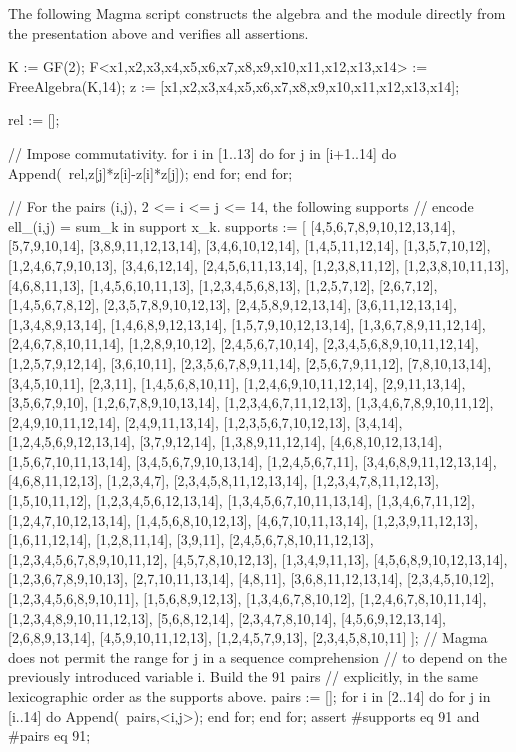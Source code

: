 \documentclass[a4paper]{amsart}
\theoremstyle{definition}
\theoremstyle{remark}
\numberwithin{equation}{section}
\begin{document}
The following Magma script constructs the algebra and the module directly from the presentation above and verifies all assertions.
\begin{MagmaCode}
K := GF(2);
F<x1,x2,x3,x4,x5,x6,x7,x8,x9,x10,x11,x12,x13,x14>
    := FreeAlgebra(K,14);
z := [x1,x2,x3,x4,x5,x6,x7,x8,x9,x10,x11,x12,x13,x14];

rel := [];

// Impose commutativity.
for i in [1..13] do
    for j in [i+1..14] do
        Append(~rel,z[j]*z[i]-z[i]*z[j]);
    end for;
end for;

// For the pairs (i,j), 2 <= i <= j <= 14, the following supports
// encode ell_(i,j) = sum_{k in support} x_k.
supports := [
    [4,5,6,7,8,9,10,12,13,14], [5,7,9,10,14], [3,8,9,11,12,13,14], [3,4,6,10,12,14],
    [1,4,5,11,12,14], [1,3,5,7,10,12], [1,2,4,6,7,9,10,13], [3,4,6,12,14],
    [2,4,5,6,11,13,14], [1,2,3,8,11,12], [1,2,3,8,10,11,13], [4,6,8,11,13],
    [1,4,5,6,10,11,13], [1,2,3,4,5,6,8,13], [1,2,5,7,12], [2,6,7,12],
    [1,4,5,6,7,8,12], [2,3,5,7,8,9,10,12,13], [2,4,5,8,9,12,13,14], [3,6,11,12,13,14],
    [1,3,4,8,9,13,14], [1,4,6,8,9,12,13,14], [1,5,7,9,10,12,13,14], [1,3,6,7,8,9,11,12,14],
    [2,4,6,7,8,10,11,14], [1,2,8,9,10,12], [2,4,5,6,7,10,14], [2,3,4,5,6,8,9,10,11,12,14],
    [1,2,5,7,9,12,14], [3,6,10,11], [2,3,5,6,7,8,9,11,14], [2,5,6,7,9,11,12],
    [7,8,10,13,14], [3,4,5,10,11], [2,3,11], [1,4,5,6,8,10,11],
    [1,2,4,6,9,10,11,12,14], [2,9,11,13,14], [3,5,6,7,9,10], [1,2,6,7,8,9,10,13,14],
    [1,2,3,4,6,7,11,12,13], [1,3,4,6,7,8,9,10,11,12], [2,4,9,10,11,12,14], [2,4,9,11,13,14],
    [1,2,3,5,6,7,10,12,13], [3,4,14], [1,2,4,5,6,9,12,13,14], [3,7,9,12,14],
    [1,3,8,9,11,12,14], [4,6,8,10,12,13,14], [1,5,6,7,10,11,13,14], [3,4,5,6,7,9,10,13,14],
    [1,2,4,5,6,7,11], [3,4,6,8,9,11,12,13,14], [4,6,8,11,12,13], [1,2,3,4,7],
    [2,3,4,5,8,11,12,13,14], [1,2,3,4,7,8,11,12,13], [1,5,10,11,12], [1,2,3,4,5,6,12,13,14],
    [1,3,4,5,6,7,10,11,13,14], [1,3,4,6,7,11,12], [1,2,4,7,10,12,13,14], [1,4,5,6,8,10,12,13],
    [4,6,7,10,11,13,14], [1,2,3,9,11,12,13], [1,6,11,12,14], [1,2,8,11,14],
    [3,9,11], [2,4,5,6,7,8,10,11,12,13], [1,2,3,4,5,6,7,8,9,10,11,12], [4,5,7,8,10,12,13],
    [1,3,4,9,11,13], [4,5,6,8,9,10,12,13,14], [1,2,3,6,7,8,9,10,13], [2,7,10,11,13,14],
    [4,8,11], [3,6,8,11,12,13,14], [2,3,4,5,10,12], [1,2,3,4,5,6,8,9,10,11],
    [1,5,6,8,9,12,13], [1,3,4,6,7,8,10,12], [1,2,4,6,7,8,10,11,14], [1,2,3,4,8,9,10,11,12,13],
    [5,6,8,12,14], [2,3,4,7,8,10,14], [4,5,6,9,12,13,14], [2,6,8,9,13,14],
    [4,5,9,10,11,12,13], [1,2,4,5,7,9,13], [2,3,4,5,8,10,11]
];
// Magma does not permit the range for j in a sequence comprehension
// to depend on the previously introduced variable i.  Build the 91 pairs
// explicitly, in the same lexicographic order as the supports above.
pairs := [];
for i in [2..14] do
    for j in [i..14] do
        Append(~pairs,<i,j>);
    end for;
end for;
assert #supports eq 91 and #pairs eq 91;


\end{MagmaCode}
\end{document}
